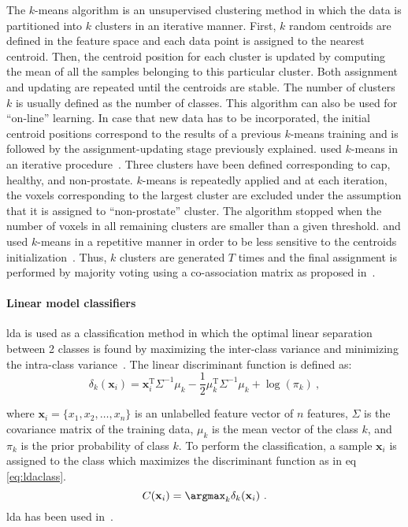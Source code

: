 The $k$-means algorithm is an unsupervised clustering method in which the data is partitioned into $k$ clusters in an iterative manner.
First, $k$ random centroids are defined in the feature space and each data point is assigned to the nearest centroid.
Then, the centroid position for each cluster is updated by computing the mean of all the samples belonging to this particular cluster.
Both assignment and updating are repeated until the centroids are stable.
The number of clusters $k$ is usually defined as the number of classes.
This algorithm can also be used for ``on-line'' learning.
In case that new data has to be incorporated, the initial centroid positions correspond to the results of a previous $k$-means training and is followed by the assignment-updating stage previously explained.
\citeauthor{Tiwari2009} used $k$-means in an iterative procedure~\cite{Tiwari2007,Tiwari2009}.
Three clusters have been defined corresponding to \ac{cap}, healthy, and non-prostate.
$k$-means is repeatedly applied and at each iteration, the voxels corresponding to the largest cluster are excluded under the assumption that it is assigned to ``non-prostate'' cluster.
The algorithm stopped when the number of voxels in all remaining clusters are smaller than a given threshold.
\citeauthor{Tiwari2008} and \citeauthor{Viswanath2008a} used $k$-means in a repetitive manner in order to be less sensitive to the centroids initialization~\cite{Viswanath2008,Viswanath2008a,Tiwari2008}.
Thus, $k$ clusters are generated $T$ times and the final assignment is performed by majority voting using a co-association matrix as proposed in~\cite{Fred2005}.

\paragraph{Linear model classifiers}
\Acf{lda} is used as a classification method in which the optimal linear separation between 2 classes is found by maximizing the inter-class variance and minimizing the intra-class variance~\cite{Friedman1989}.
The linear discriminant function is defined as:
\begin{equation}
	\delta_{k}(\mathbf{x}_i) = \mathbf{x}_i^{\text{T}} \Sigma^{-1} \mu_k - \frac{1}{2} \mu_{k}^{\text{T}} \Sigma^{-1} \mu_k + \log (\pi_k) \ ,
	\label{eq:ldafun}
\end{equation}

\noindent where $\mathbf{x}_i = \{x_1, x_2, \dots , x_n\}$ is an unlabelled feature vector of $n$ features, $\Sigma$ is the covariance matrix of the training data, $\mu_k$ is the mean vector of the class $k$, and $\pi_k$ is the prior probability of class $k$.
To perform the classification, a sample $\mathbf{x}_i$ is assigned to the class which maximizes the discriminant function as in \acs{eq}\,\eqref{eq:ldaclass}.
\begin{equation}
	C(\mathbf{x}_i) = \argmax_k \delta_k(\mathbf{x}_i) \ .
	\label{eq:ldaclass}
\end{equation}
\Ac{lda} has been used in~\cite{Antic2013,Chan2003,Niaf2011,Niaf2012,Vos2012}.

